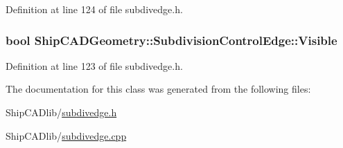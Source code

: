 Definition at line 124 of file subdivedge.\-h.

\hypertarget{classShipCADGeometry_1_1SubdivisionControlEdge_ae0d06a7dc36895347443a4c236bc1ea8}{
\subsubsection[{Visible}]{\setlength{\rightskip}{0pt plus 5cm}bool Ship\-C\-A\-D\-Geometry\-::\-Subdivision\-Control\-Edge\-::\-Visible\hspace{0.3cm}{\ttfamily [read]}}}\label{classShipCADGeometry_1_1SubdivisionControlEdge_ae0d06a7dc36895347443a4c236bc1ea8}


Definition at line 123 of file subdivedge.\-h.



The documentation for this class was generated from the following files\-:\begin{DoxyCompactItemize}
\item 
Ship\-C\-A\-Dlib/\hyperlink{subdivedge_8h}{subdivedge.\-h}\item 
Ship\-C\-A\-Dlib/\hyperlink{subdivedge_8cpp}{subdivedge.\-cpp}\end{DoxyCompactItemize}
